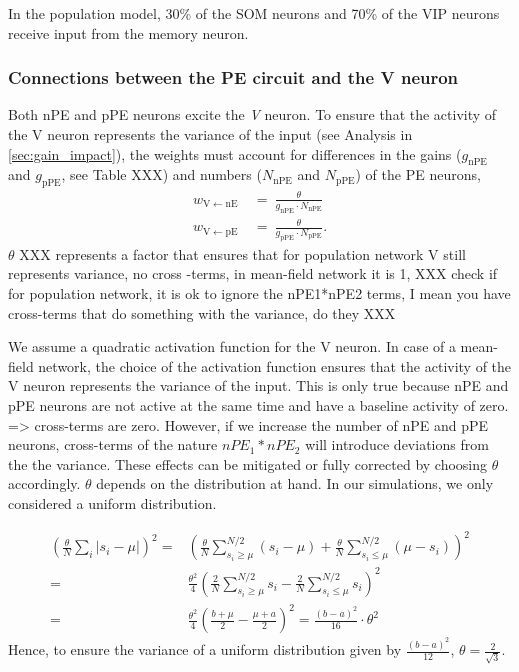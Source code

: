 \documentclass[10pt,a4paper,draft]{article}
\begin{document}
In the population model, 30\% of the SOM neurons and 70\% of the VIP neurons receive input from the memory neuron.

\subsubsection{Connections between the PE circuit and the V neuron}
%
Both nPE and pPE neurons excite the \textit{V} neuron. To ensure that the activity of the V neuron represents the variance of the input (see Analysis in \ref{sec:gain_impact}), the weights must account for differences in the gains ($g_\mathrm{nPE}$ and $g_\mathrm{pPE}$, see Table XXX) and numbers ($N_\mathrm{nPE}$ and $N_\mathrm{pPE}$) of the PE neurons,
%
\begin{align*}
w_\mathrm{V\leftarrow nE}\  &=\ \frac{\theta}{g_\mathrm{nPE} \cdot N_\mathrm{nPE}} \nonumber\\
w_\mathrm{V\leftarrow pE}\  &=\ \frac{\theta}{g_\mathrm{pPE} \cdot N_\mathrm{pPE}}.
\end{align*}
%
$\theta$ XXX represents a factor that ensures that for population network V still represents variance, no cross -terms, in mean-field network it is 1, XXX check if for population network, it is ok to ignore the nPE1*nPE2 terms, I mean you have cross-terms that do something with the variance, do they XXX

We assume a quadratic activation function for the V neuron. In case of a mean-field network, the choice of the activation function ensures that the activity of the V neuron represents the variance of the input. This is only true because nPE and pPE neurons are not active at the same time and have a baseline activity of zero. => cross-terms are zero. However, if we increase the number of nPE and pPE neurons, cross-terms of the nature $nPE_1 * nPE_2$ will introduce deviations from the the variance. These effects can be mitigated or fully corrected by choosing $\theta$ accordingly. $\theta$ depends on the distribution at hand. In our simulations, we only considered a uniform distribution. 

\begin{align}
\left(\frac{\theta}{N} \sum_{i} |s_i - \mu| \right)^2 =& \left( \frac{\theta}{N}  \sum_{s_i \geq \mu}^{N/2} (s_i - \mu) + \frac{\theta}{N}  \sum_{s_i \leq \mu}^{N/2} (\mu - s_i )\right)^2 \nonumber \\
 =& \frac{\theta^2}{4} \left( \frac{2}{N} \sum_{s_i \geq \mu}^{N/2} s_i - \frac{2}{N} \sum_{s_i \leq \mu}^{N/2} s_i\right)^2\nonumber\\
 =& \frac{\theta^2}{4} \left( \frac{b+\mu}{2} - \frac{\mu + a}{2} \right)^2 = \frac{(b-a)^2}{16} \cdot \theta^2
\end{align}
%
Hence, to ensure the variance of a uniform distribution given by $\frac{(b-a)^2}{12}$, $\theta = \frac{2}{\sqrt{3}}$.
\end{document}
